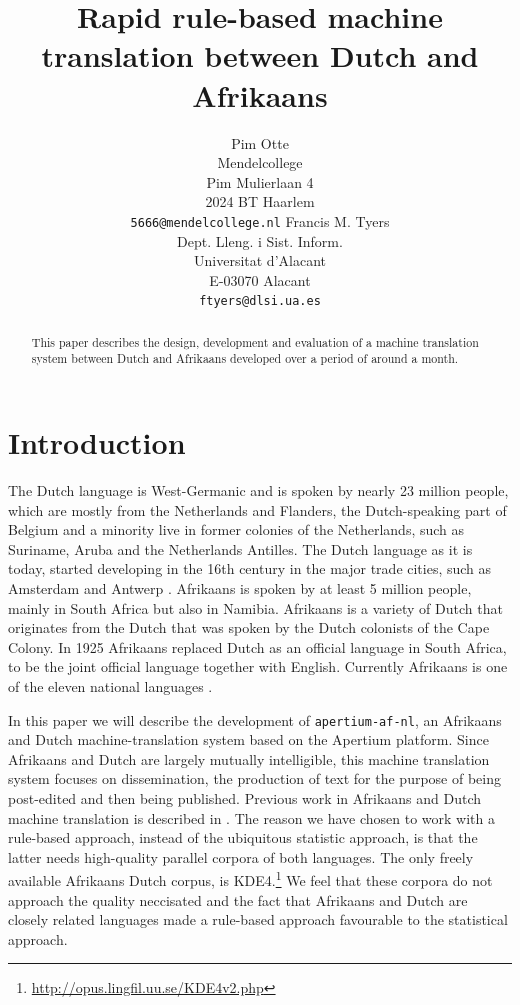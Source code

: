 \documentclass[11pt]{article}
\title{Rapid rule-based machine translation between Dutch and Afrikaans}
\author{Pim Otte\\
  Mendelcollege\\
  Pim Mulierlaan 4\\
  2024 BT Haarlem\\
  {\tt 5666@mendelcollege.nl}  \And
  Francis M. Tyers\\
  Dept. Lleng. i Sist. Inform.\\
  Universitat d'Alacant\\
  E-03070 Alacant \\
  {\tt ftyers@dlsi.ua.es}}
\date{}
\begin{document}
\maketitle
\begin{abstract}
 This paper describes the design, development and evaluation of a machine
 translation system between Dutch and Afrikaans developed over a period of
 around a month.
\end{abstract}

\section{Introduction}

The Dutch language is West-Germanic and is spoken by nearly 23 million people, which are 
mostly from the Netherlands and Flanders, the Dutch-speaking part of Belgium and a minority 
live in former colonies of the Netherlands, such as Suriname, Aruba and the Netherlands 
Antilles. The Dutch language as it is today, started developing in the 16th century in the 
major trade cities, such as Amsterdam and Antwerp \cite{Shetter:02}.  Afrikaans is spoken 
by at least 5 million people, mainly in South Africa but also in Namibia. Afrikaans is a 
variety of Dutch that originates from the Dutch that was spoken by the Dutch colonists of 
the Cape Colony. In 1925 Afrikaans replaced Dutch as an official language in South Africa, to 
be the joint official language together with English. Currently Afrikaans is one of the 
eleven national languages \cite{Donaldson:93}.

In this paper we will describe the development of {\small {\tt apertium-af-nl}}, an Afrikaans 
and Dutch machine-translation system based on the Apertium platform. Since Afrikaans and Dutch 
are largely mutually intelligible, this machine translation system focuses on dissemination, the 
production of text for the purpose of being post-edited and then being published. Previous 
work in Afrikaans and Dutch machine translation is described in \cite{Huyssteen:09}. The reason
we have chosen to work with a rule-based approach, instead of the ubiquitous statistic approach,
is that the latter needs high-quality parallel corpora of both languages. The only freely available
Afrikaans Dutch corpus, is KDE4.\footnote{\url{http://opus.lingfil.uu.se/KDE4v2.php}} We feel
that these corpora do not approach the quality neccisated and the fact that Afrikaans and Dutch
are closely related languages made a rule-based approach favourable to the statistical approach.
\end{document}
